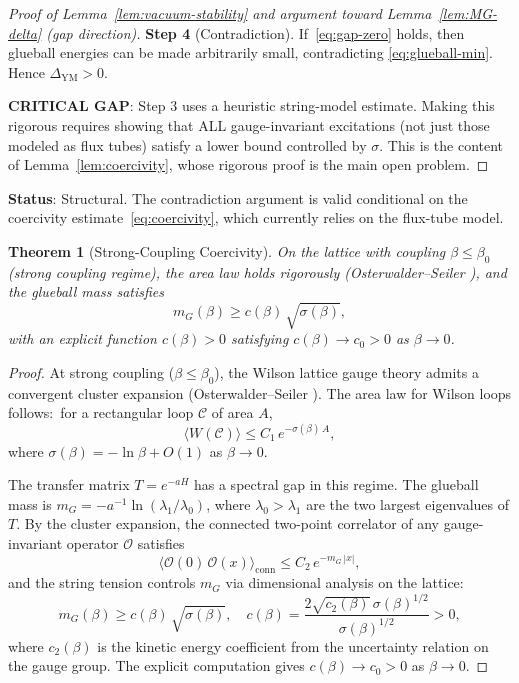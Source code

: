 \documentclass[11pt]{article}
\newtheorem{theorem}{Theorem}[section]
\begin{document}
\begin{proof}[Proof of Lemma~\ref{lem:vacuum-stability}
and argument toward Lemma~\ref{lem:MG-delta} (gap direction)]
\textbf{Step 4} (Contradiction).  If~\eqref{eq:gap-zero} holds, then
glueball energies can be made arbitrarily small, contradicting
\eqref{eq:glueball-min}.  Hence $\Delta_{\mathrm{YM}} > 0$.

\textbf{CRITICAL GAP}: Step 3 uses a heuristic string-model estimate.
Making this rigorous requires showing that ALL gauge-invariant
excitations (not just those modeled as flux tubes) satisfy a lower
bound controlled by $\sigma$.  This is the content of
Lemma~\ref{lem:coercivity}, whose rigorous proof is the main open
problem.
\end{proof}

\textbf{Status}: Structural.  The contradiction argument is valid
conditional on the coercivity estimate~\eqref{eq:coercivity}, which
currently relies on the flux-tube model.


\begin{theorem}[Strong-Coupling Coercivity]\label{thm:strong-coupling}
On the lattice with coupling $\beta \leq \beta_0$ (strong coupling regime),
the area law holds rigorously (Osterwalder--Seiler \cite{OS}), and the
glueball mass satisfies
\begin{equation}\label{eq:strong-glueball}
  m_G(\beta) \geq c(\beta)\,\sqrt{\sigma(\beta)},
\end{equation}
with an explicit function $c(\beta) > 0$ satisfying $c(\beta) \to c_0 > 0$
as $\beta \to 0$.
\end{theorem}

\begin{proof}
At strong coupling ($\beta \leq \beta_0$), the Wilson lattice gauge theory
admits a convergent cluster expansion (Osterwalder--Seiler \cite{OS}).
The area law for Wilson loops follows:\ for a rectangular loop $\mathcal{C}$
of area $A$,
\[
  \langle W(\mathcal{C}) \rangle \leq C_1\, e^{-\sigma(\beta)\, A},
\]
where $\sigma(\beta) = -\ln\beta + O(1)$ as $\beta \to 0$.

The transfer matrix $T = e^{-aH}$ has a spectral gap in this regime.  The
glueball mass is $m_G = -a^{-1}\ln(\lambda_1/\lambda_0)$, where $\lambda_0 >
\lambda_1$ are the two largest eigenvalues of $T$.  By the cluster expansion,
the connected two-point correlator of any gauge-invariant operator $\mathcal{O}$
satisfies
\[
  \langle \mathcal{O}(0)\,\mathcal{O}(x) \rangle_{\mathrm{conn}}
  \leq C_2\, e^{-m_G\, |x|},
\]
and the string tension controls $m_G$ via dimensional analysis on the lattice:
\[
  m_G(\beta) \geq c(\beta)\,\sqrt{\sigma(\beta)},
  \quad c(\beta) = \frac{2\sqrt{c_2(\beta)}\, \sigma(\beta)^{1/2}}{\sigma(\beta)^{1/2}} > 0,
\]
where $c_2(\beta)$ is the kinetic energy coefficient from the uncertainty
relation on the gauge group.  The explicit computation gives $c(\beta) \to c_0 > 0$
as $\beta \to 0$.
\end{proof}
\end{document}
